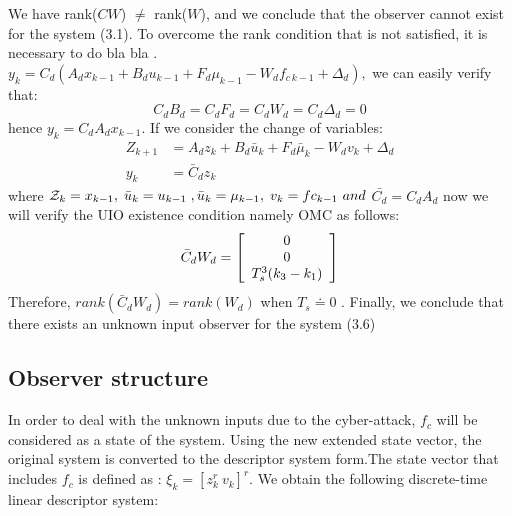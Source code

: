 \documentclass[conference]{IEEEtran}
\begin{document}
We have rank($CW$) $\neq$ rank($W$), and we conclude that the observer cannot exist for the system {\color{red}(3.1)}.
To overcome the rank condition that is not satisfied, it is necessary to do {\color{red}bla bla .}
$y_{k}=C_{d}(A_{d}x_{k-1}+B_{d}u_{k-1}+F_{d}\mu_{k-1}-W_{d}f_{c\,k-1}+\Delta_{d}),$
we can easily verify that: $$C_{d}B_{d}=C_{d}F_{d}=C_{d}W_{d}=C_{d}\Delta_{d}=0$$
hence $y_{k}=C_{d}A_{d}x_{k-1}.$
If we consider the change of variables:
\begin{equation}
    \begin{aligned}
        {Z_{k+1}} &=A_{d}z_{k}+B_{d}\bar{u}_{k}+F_{d}\bar{\mu}_{k}-W_{d}v_{k}+\Delta_{d}\\ 
        y_{k} &=\bar{C}_{d}z_{k}
    \end{aligned}
\end{equation}
where ${\cal Z}_{k}=x_{k-1},\;\bar{u}_{k}=u_{k-1}\;,\bar{u}_{k}=\mu_{k-1},\;v_{k}=fc_{k-1}\ and$ $\bar{C_d} = C_{d}A_{d}$
now we will verify the UIO existence condition namely OMC as follows: 
\begin{equation}
    \bar{C}_{d}W_{d}=\left[\begin{array}{c c c}
    0 \\
    0 \\
    {{T_{s}^{3}(k_{3}-k_{1})}}
    \end{array}\right]
\end{equation}
Therefore, $rank(\bar{C}_{d}W_{d})=rank(W_{d})$ when $T_s \doteq 0 $ . Finally, we conclude that there exists an unknown input observer for the system {\color{red}(3.6)} 
\subsection{Observer structure}
In order to deal with the unknown inputs due to the cyber-attack, $f_c$ will be considered as a state of the system. Using the new extended state vector, the original system is converted 
to the descriptor system form.The state vector that includes  $f_c$ is defined as : $\xi_{k}=[z_{k}^{r}\ v_{k}]^{r}$. We obtain the following discrete-time linear descriptor system:
\end{document}
